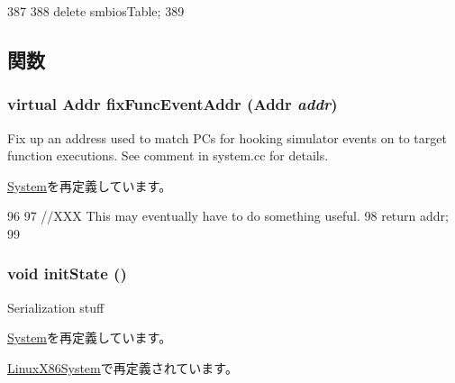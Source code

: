 \begin{DoxyCode}
387 {
388     delete smbiosTable;
389 }
\end{DoxyCode}


\subsection{関数}
\hypertarget{classX86System_aff94f650c5eef23b8dc350ea755bdef4}{
\subsubsection[{fixFuncEventAddr}]{\setlength{\rightskip}{0pt plus 5cm}virtual {\bf Addr} fixFuncEventAddr ({\bf Addr} {\em addr})}}
\label{classX86System_aff94f650c5eef23b8dc350ea755bdef4}
Fix up an address used to match PCs for hooking simulator events on to target function executions. See comment in system.cc for details. 

\hyperlink{classSystem_aff94f650c5eef23b8dc350ea755bdef4}{System}を再定義しています。


\begin{DoxyCode}
96     {
97         //XXX This may eventually have to do something useful.
98         return addr;
99     }
\end{DoxyCode}
\hypertarget{classX86System_a3c34ea9b29f410748d4435a667484924}{
\subsubsection[{initState}]{\setlength{\rightskip}{0pt plus 5cm}void initState ()}}
\label{classX86System_a3c34ea9b29f410748d4435a667484924}
Serialization stuff 

\hyperlink{classSystem_a3c34ea9b29f410748d4435a667484924}{System}を再定義しています。

\hyperlink{classLinuxX86System_a3c34ea9b29f410748d4435a667484924}{LinuxX86System}で再定義されています。


